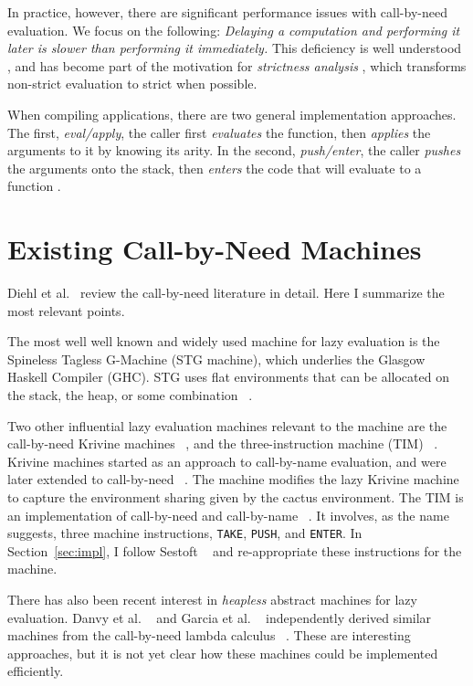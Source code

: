In practice, however, there are significant performance issues with call-by-need
evaluation.  We focus on the following: \emph{Delaying a computation and
performing it later is slower than performing it immediately.} This deficiency
is well understood \cite{johnsson1984efficient,jonesstg}, and has become part of
the motivation for \emph{strictness analysis}
\cite{mycroft1982abstract,wadler1987projections}, which transforms non-strict
evaluation to strict when possible.

When compiling applications, there are two general implementation approaches.
The first, \emph{eval/apply}, the caller first \emph{evaluates} the function,
then \emph{applies} the arguments to it by knowing its arity. In the second,
\emph{push/enter}, the caller \emph{pushes} the arguments onto the stack, then
\emph{enters} the code that will evaluate to a function \cite{marlow2006making}.  

\section{Existing Call-by-Need Machines}

Diehl et al.~\cite{diehl2000abstract} review the call-by-need
literature in detail.  Here I summarize the most relevant points.

The most well well known and widely used machine for lazy evaluation is the
Spineless Tagless G-Machine (STG machine), which underlies the Glasgow Haskell
Compiler (GHC).  STG uses flat environments that can be allocated on the stack,
the heap, or some combination ~\cite{jonesstg}.  

Two other influential lazy evaluation machines relevant to the \ce 
machine are the call-by-need Krivine machines
~\cite{lkm,krivine2007call,sestoft}, and the three-instruction machine (TIM)
~\cite{TIM}.  Krivine machines started as an approach to call-by-name
evaluation, and were later extended to call-by-need
~\cite{krivine2007call,sestoft,danvy2013synthetic,lkm}.  The \ce machine
modifies the lazy Krivine machine to capture the environment sharing given by
the cactus environment. The TIM is an implementation of call-by-need and
call-by-name ~\cite{TIM}.  It involves, as the name suggests, three machine
instructions, \texttt{TAKE}, \texttt{PUSH}, and \texttt{ENTER}. In
Section~\ref{sec:impl}, I follow Sestoft ~\cite{sestoft} and
re-appropriate these instructions for the \ce machine.

There has also been recent interest in \emph{heapless} abstract
machines for lazy evaluation. Danvy et al. ~\cite{danvy2012inter} and
Garcia et al. ~\cite{garcia2009lazy} independently derived similar
machines from the call-by-need lambda calculus
~\cite{ariola1995call}. These are interesting approaches, but it is not yet
clear how these machines could be implemented efficiently.


